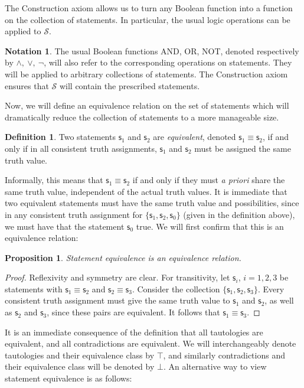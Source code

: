 \documentclass[psamsfonts]{amsart}
\newtheorem{prop}[thm]{Proposition}
\theoremstyle{definition}
\newtheorem{defn}[thm]{Definition}
\newtheorem{notn}[thm]{Notation}
\theoremstyle{remark}
\numberwithin{equation}{section}
\def\tautology{\top}
\def\contradiction{\bot}
\def\AND{\wedge}
\def\OR{\vee}
\def\NOT{\neg}
\newcommand{\stmt}[1][s] {\mathsf{#1}}
\begin{document}
The Construction axiom allows us to turn any Boolean function into a function on the collection of statements. In particular, the usual logic operations can be applied to $\mathcal{S}$. 

\begin{notn}
The usual Boolean functions AND, OR, NOT, denoted respectively by $\AND,\ \OR,\ \NOT$, will also refer to the corresponding operations on statements. They will be applied to arbitrary collections of statements. The Construction axiom ensures that $\mathcal{S}$ will contain the prescribed statements. 
\end{notn}




Now, we will define an equivalence relation on the set of statements which will dramatically reduce the collection of statements to a more manageable size. 

\begin{defn}
Two statements $\stmt_1$ and $\stmt_2$ are \emph{equivalent}, denoted $\stmt_1 \equiv \stmt_2$, if and only if in all consistent truth assignments, $\stmt_1$ and $\stmt_2$ must be assigned the same truth value. 
\end{defn}

Informally, this means that $\stmt_1\equiv\stmt_2$ if and only if they must \emph{a priori} share the same truth value, independent of the actual truth values. It is immediate that two equivalent statements must have the same truth value and possibilities, since in any consistent truth assignment for $\{\stmt_1,\stmt_2,\stmt_0\}$ (given in the definition above), we must have that the statement $\stmt_0$ true. We will first confirm that this is an equivalence relation:

\begin{prop}
Statement equivalence is an equivalence relation.
\end{prop}
\begin{proof}
Reflexivity and symmetry are clear. For transitivity, let $\stmt_i$, $i=1,2,3$ be statements with $\stmt_1\equiv\stmt_2$ and $\stmt_2\equiv\stmt_3$. Consider the collection $\{\stmt_1,\stmt_2,\stmt_3\}$. Every consistent truth assignment must give the same truth value to $\stmt_1$ and $\stmt_2$, as well as $\stmt_2$ and $\stmt_3$, since these pairs are equivalent. It follows that $\stmt_1\equiv\stmt_3$. 
\end{proof}

It is an immediate consequence of the definition that all tautologies are equivalent, and all contradictions are equivalent. We will interchangeably denote tautologies and their equivalence class by $\tautology$, and similarly contradictions and their equivalence class will be denoted by $\contradiction$. An alternative way to view statement equivalence is as follows: 
\end{document}
